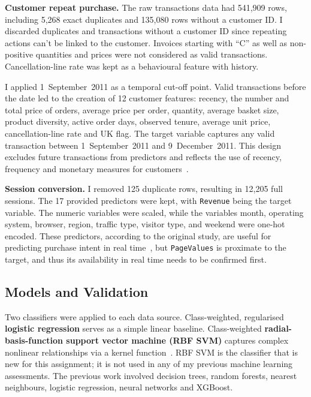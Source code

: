 \textbf{Customer repeat purchase.} The raw transactions data had 541,909 rows, including 5,268 exact duplicates and 135,080 rows without a customer ID. I discarded duplicates and transactions without a customer ID since repeating actions can't be linked to the customer. Invoices starting with ``C'' as well as non-positive quantities and prices were not considered as valid transactions. Cancellation-line rate was kept as a behavioural feature with history.

I applied 1~September~2011 as a temporal cut-off point. Valid transactions before the date led to the creation of 12 customer features: recency, the number and total price of orders, average price per order, quantity, average basket size, product diversity, active order days, observed tenure, average unit price, cancellation-line rate and UK flag. The target variable captures any valid transaction between 1~September~2011 and 9~December~2011. This design excludes future transactions from predictors and reflects the use of recency, frequency and monetary measures for customers~\cite{chen2012datamining}.

\textbf{Session conversion.} I removed 125 duplicate rows, resulting in 12,205 full sessions. The 17 provided predictors were kept, with \texttt{Revenue} being the target variable. The numeric variables were scaled, while the variables month, operating system, browser, region, traffic type, visitor type, and weekend were one-hot encoded. These predictors, according to the original study, are useful for predicting purchase intent in real time~\cite{sakar2019realtime}, but 
\texttt{PageValues} is proximate to the target, and thus its availability in real time needs to be confirmed first.

\subsection{Models and Validation}

Two classifiers were applied to each data source. Class-weighted, regularised \textbf{logistic regression} serves as a simple linear baseline. Class-weighted \textbf{radial-basis-function support vector machine (RBF SVM)} captures complex nonlinear relationships via a kernel function~\cite{cortes1995support}. RBF SVM is the classifier that is new for this assignment; it is not used in any of my previous machine learning assessments. The previous work involved decision trees, random forests, nearest neighbours, logistic regression, neural networks and XGBoost.

